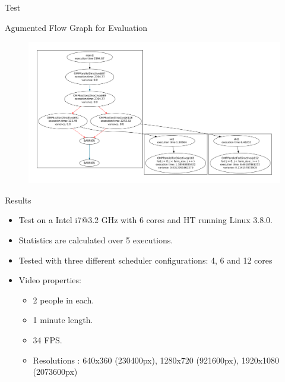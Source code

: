 \documentclass[xcolor=dvipsnames]{beamer}
\begin{document}
\begin{section}{Test}
\begin{frame}{\hskip 0.3cm Agumented Flow Graph for Evaluation}
\begin{figure}
\includegraphics[scale=0.23]{test.pdf}
\end{figure}

\end{frame}

















\begin{frame}{\hskip 0.3cm Results}
\vskip -1cm
\begin{itemize}

\item Test on a Intel i7@3.2 GHz with 6 cores and HT running Linux 3.8.0.

\item Statistics are calculated over 5 executions.

\item Tested with three different scheduler configurations: 4, 6 and 12 cores

\item Video properties:

\begin{itemize}

\item 2 people in each.

\item 1 minute length.

\item 34 FPS.

\item Resolutions : 640x360 (230400px), 1280x720 (921600px), 1920x1080 (2073600px)

\end{itemize}


\end{itemize}
\end{frame}
\end{section}
\end{document}
